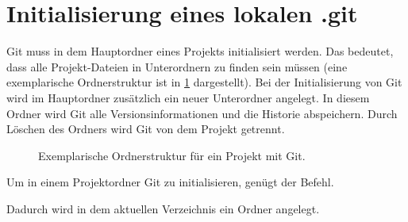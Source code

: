 \section{Initialisierung eines lokalen .git}
Git muss in dem Hauptordner eines Projekts initialisiert werden. Das bedeutet, dass alle Projekt-Dateien in Unterordnern zu finden sein müssen (eine exemplarische Ordnerstruktur ist in \ref{fig:dir_struc} dargestellt). Bei der Initialisierung von Git wird im Hauptordner zusätzlich ein neuer Unterordner   angelegt. In diesem Ordner wird Git alle Versionsinformationen und die Historie abspeichern. Durch Löschen des Ordners wird Git von dem Projekt getrennt.
\begin{figure}[!h]
    \caption{Exemplarische Ordnerstruktur für ein Projekt mit Git.}
    \label{fig:dir_struc}
\end{figure}

Um in einem Projektordner Git zu initialisieren, genügt der Befehl. 
Dadurch wird in dem aktuellen Verzeichnis ein  Ordner angelegt.
%
